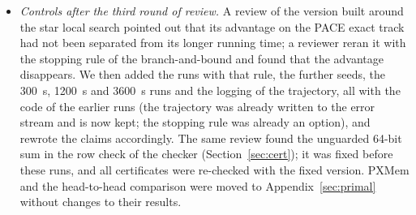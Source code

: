 \begin{itemize}
runs.  All reported runs are from one version of its code, except the leaf
cap on two graphs, which was added after their first runs had been killed.
Its runs are therefore not out of sample in the sense of the held-out
protocol, which was fixed for the head-to-head comparison.
\item \emph{Controls after the third round of review.}  A review of the
version built around the star local search pointed out that its advantage on
the PACE exact track had not been separated from its longer running time; a
reviewer reran it with the stopping rule of the branch-and-bound and found
that the advantage disappears.  We then added the runs with that rule, the
further seeds, the \SI{300}{s}, \SI{1200}{s} and \SI{3600}{s} runs and the
logging of the trajectory, all with the code of the earlier runs (the
trajectory was already written to the error stream and is now kept; the
stopping rule was already an option), and rewrote the claims accordingly.
The same review found the unguarded 64-bit sum in the row check of the
checker (Section~\ref{sec:cert}); it was fixed before these runs, and all
certificates were re-checked with the fixed version.  PXMem and the
head-to-head comparison were moved to Appendix~\ref{sec:primal} without
changes to their results.
\end{itemize}
